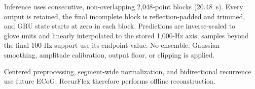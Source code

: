 Inference uses consecutive, non-overlapping 2,048-point blocks (20.48~s). Every output is retained, the final incomplete block is reflection-padded and trimmed, and GRU state starts at zero in each block. Predictions are inverse-scaled to glove units and linearly interpolated to the stored 1,000-Hz axis; samples beyond the final 100-Hz support use its endpoint value. No ensemble, Gaussian smoothing, amplitude calibration, output floor, or clipping is applied.

Centered preprocessing, segment-wide normalization, and bidirectional recurrence use future ECoG; RecurFlex therefore performs offline reconstruction.

